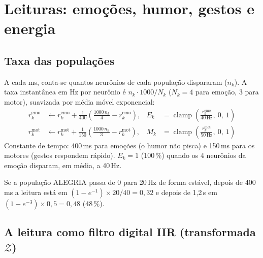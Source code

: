 \documentclass[11pt,a4paper]{article}
\newcommand{\Hz}{\,\mathrm{Hz}}
\begin{document}
\section{Leituras: emoções, humor, gestos e energia}\label{sec:leituras}

\subsection{Taxa das populações}

A cada ms, conta-se quantos neurônios de cada população dispararam ($n_k$). A taxa instantânea em Hz por neurônio é $n_k \cdot 1000/N_k$
($N_k = 4$ para emoção, 3 para motor), suavizada por média móvel exponencial:
\begin{align}
r^\text{emo}_k &\leftarrow r^\text{emo}_k + \frac{1}{400}\left(\frac{1000\,n_k}{4} - r^\text{emo}_k\right), &
E_k &= \operatorname{clamp}\!\left(\frac{r^\text{emo}_k}{40\Hz},\ 0,\ 1\right) \\
r^\text{mot}_k &\leftarrow r^\text{mot}_k + \frac{1}{150}\left(\frac{1000\,n_k}{3} - r^\text{mot}_k\right), &
M_k &= \operatorname{clamp}\!\left(\frac{r^\text{mot}_k}{50\Hz},\ 0,\ 1\right)
\end{align}
Constante de tempo: 400\,ms para emoções (o humor não pisca) e 150\,ms para os motores (gestos respondem rápido).
$E_k = 1$ (100\,\%) quando os 4 neurônios da emoção disparam, em média, a 40\,Hz.

\begin{exemplo}
Se a população ALEGRIA passa de 0 para 20\,Hz de forma estável, depois de 400\,ms a leitura está em
$(1-e^{-1}) \times 20/40 = 0{,}32$ e depois de 1,2\,s em $(1-e^{-3})\times 0{,}5 = 0{,}48$ (48\,\%).
\end{exemplo}

\subsection{A leitura como filtro digital IIR (transformada \texorpdfstring{$\mathcal{Z}$}{Z})}
\end{document}
